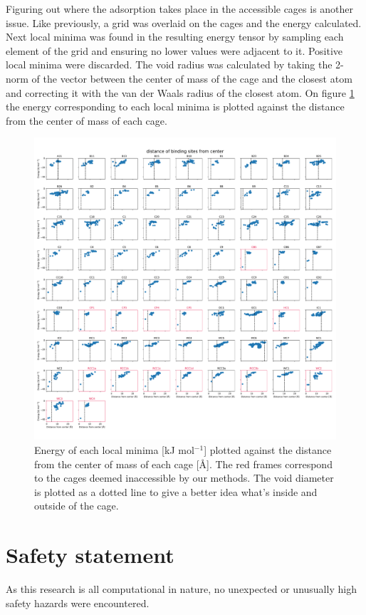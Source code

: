 \documentclass[journal=jacsat,manuscript=article]{achemso}
\begin{document}
Figuring out where the adsorption takes place in the accessible cages is another issue. Like previously, a grid was overlaid on the cages and the energy calculated. Next local minima was found in the resulting energy tensor by sampling each element of the grid and ensuring no lower values were adjacent to it. Positive local minima were discarded. The void radius was calculated by taking the 2-norm of the vector between the center of mass of the cage and the closest atom and correcting it with the van der Waals radius of the closest atom. On figure \ref{fig:energy_vs_dist} the energy corresponding to each local minima is plotted against the distance from the center of mass of each cage.

\begin{figure}
\centering
	\includegraphics[width=\columnwidth]{../distance_of_binding_sites.pdf}
	\caption{Energy of each local minima [kJ mol$^{-1}$] plotted against the distance from the center of mass of each cage [\AA]. The red frames correspond to the cages deemed inaccessible by our methods. The void diameter is plotted as a dotted line to give a better idea what's inside and outside of the cage.
	} \label{fig:energy_vs_dist}
\end{figure}


\clearpage

\section{Safety statement}
As this research is all computational in nature, no unexpected or unusually high safety hazards were encountered.

\clearpage


\end{document}
